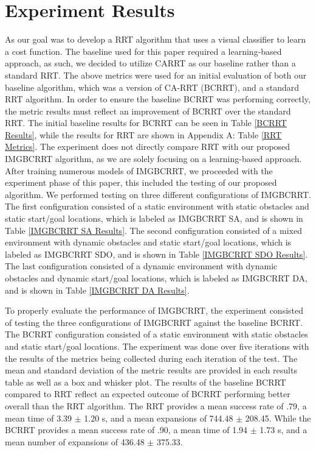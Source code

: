\documentclass{article}
\begin{document}
\section{Experiment Results}
As our goal was to develop a RRT algorithm that uses a visual classifier to learn a cost function. The baseline used for this paper required a learning-based approach, as such, we decided to utilize CARRT as our baseline rather than a standard RRT. The above metrics were used for an initial evaluation of both our baseline algorithm, which was a version of CA-RRT (BCRRT), and a standard RRT algorithm. In order to ensure the baseline BCRRT was performing correctly, the metric results must reflect an improvement of BCRRT over the standard RRT. The initial baseline results for BCRRT can be seen in Table \ref{BCRRT Results}, while the results for RRT are shown in Appendix A: Table \ref{RRT Metrics}. The experiment does not directly compare RRT with our proposed IMGBCRRT algorithm, as we are solely focusing on a learning-based approach. After training numerous models of IMGBCRRT, we proceeded with the experiment phase of this paper, this included the testing of our proposed algorithm. 
We performed testing on three different configurations of IMGBCRRT. The first configuration consisted of a static environment with static obstacles and static start/goal locations, which is labeled as IMGBCRRT SA, and is shown in Table \ref{IMGBCRRT SA Results}. The second configuration consisted of a mixed environment with dynamic obstacles and static start/goal locations, which is labeled as IMGBCRRT SDO, and is shown in Table \ref{IMGBCRRT SDO Results}. The last configuration consisted of a dynamic environment with dynamic obstacles and dynamic start/goal locations, which is labeled as IMGBCRRT DA, and is shown in Table \ref{IMGBCRRT DA Results}. 

To properly evaluate the performance of IMGBCRRT, the experiment consisted of testing the three configurations of IMGBCRRT against the baseline BCRRT. The BCRRT configuration consisted of a static environment with static obstacles and static start/goal locations. The experiment was done over five iterations with the results of the metrics being collected during each iteration of the test. The mean and standard deviation of the metric results are provided in each results table as well as a box and whisker plot. The results of the baseline BCRRT compared to RRT reflect an expected outcome of BCRRT performing better overall than the RRT algorithm. The RRT provides a mean success rate of .79, a mean time of 3.39 $\pm$ 1.20 s, and a mean expansions of 744.48 $\pm$ 208.45. While the BCRRT provides a mean success rate of .90, a mean time of 1.94 $\pm$ 1.73 s, and a mean number of expansions of 436.48 $\pm$ 375.33.
\end{document}
